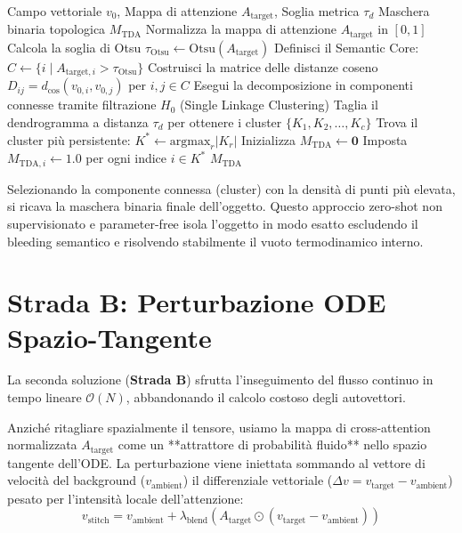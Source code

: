 \documentclass[12pt,a4paper]{report}
\begin{document}
\begin{algorithm}[h]
\caption{Algoritmo di Estrazione Maschera TDA}
\label{alg:tda}
\begin{algorithmic}[1]
\REQUIRE Campo vettoriale $v_0$, Mappa di attenzione $A_{\text{target}}$, Soglia metrica $\tau_d$
\ENSURE Maschera binaria topologica $M_{\text{TDA}}$
\STATE Normalizza la mappa di attenzione $A_{\text{target}}$ in $[0, 1]$
\STATE Calcola la soglia di Otsu $\tau_{\text{Otsu}} \leftarrow \text{Otsu}(A_{\text{target}})$
\STATE Definisci il Semantic Core: $C \leftarrow \{i \mid A_{\text{target}, i} > \tau_{\text{Otsu}}\}$
\STATE Costruisci la matrice delle distanze coseno $D_{ij} = d_{\text{cos}}(v_{0,i}, v_{0,j})$ per $i, j \in C$
\STATE Esegui la decomposizione in componenti connesse tramite filtrazione $H_0$ (Single Linkage Clustering)
\STATE Taglia il dendrogramma a distanza $\tau_d$ per ottenere i cluster $\{K_1, K_2, \dots, K_c\}$
\STATE Trova il cluster più persistente: $K^* \leftarrow \text{argmax}_{r} |K_r|$
\STATE Inizializza $M_{\text{TDA}} \leftarrow \mathbf{0}$
\STATE Imposta $M_{\text{TDA}, i} \leftarrow 1.0$ per ogni indice $i \in K^*$
\RETURN $M_{\text{TDA}}$
\end{algorithmic}
\end{algorithm}

Selezionando la componente connessa (cluster) con la densità di punti più elevata, si ricava la maschera binaria finale dell'oggetto. Questo approccio zero-shot non supervisionato e parameter-free isola l'oggetto in modo esatto escludendo il bleeding semantico e risolvendo stabilmente il vuoto termodinamico interno.

\section{Strada B: Perturbazione ODE Spazio-Tangente}
La seconda soluzione (\textbf{Strada B}) sfrutta l'inseguimento del flusso continuo in tempo lineare $\mathcal{O}(N)$, abbandonando il calcolo costoso degli autovettori. 

Anziché ritagliare spazialmente il tensore, usiamo la mappa di cross-attention normalizzata $A_{\text{target}}$ come un **attrattore di probabilità fluido** nello spazio tangente dell'ODE. La perturbazione viene iniettata sommando al vettore di velocità del background ($v_{\text{ambient}}$) il differenziale vettoriale ($\Delta v = v_{\text{target}} - v_{\text{ambient}}$) pesato per l'intensità locale dell'attenzione:
\begin{equation}
    v_{\text{stitch}} = v_{\text{ambient}} + \lambda_{\text{blend}} \left( A_{\text{target}} \odot (v_{\text{target}} - v_{\text{ambient}}) \right)
\end{equation}
\end{document}
